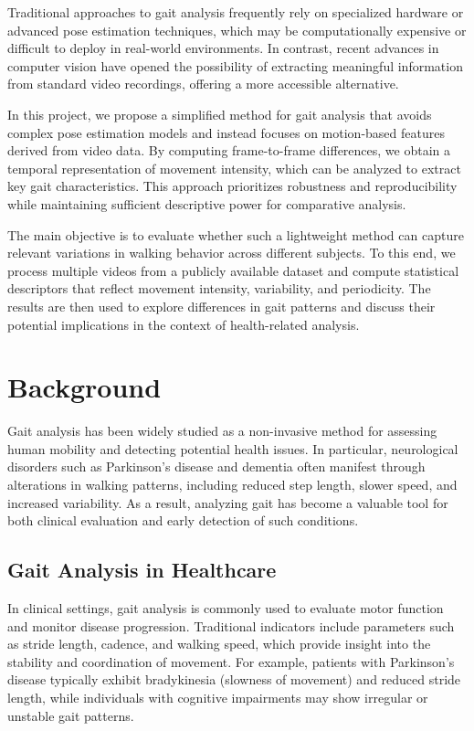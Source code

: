 \documentclass[12pt,a4paper]{article} %
\begin{document}
Traditional approaches to gait analysis frequently rely on specialized hardware or advanced pose estimation techniques, which may be computationally expensive or difficult to deploy in real-world environments. In contrast, recent advances in computer vision have opened the possibility of extracting meaningful information from standard video recordings, offering a more accessible alternative.

In this project, we propose a simplified method for gait analysis that avoids complex pose estimation models and instead focuses on motion-based features derived from video data. By computing frame-to-frame differences, we obtain a temporal representation of movement intensity, which can be analyzed to extract key gait characteristics. This approach prioritizes robustness and reproducibility while maintaining sufficient descriptive power for comparative analysis.

The main objective is to evaluate whether such a lightweight method can capture relevant variations in walking behavior across different subjects. To this end, we process multiple videos from a publicly available dataset and compute statistical descriptors that reflect movement intensity, variability, and periodicity. The results are then used to explore differences in gait patterns and discuss their potential implications in the context of health-related analysis.

\clearpage

\section{Background}
Gait analysis has been widely studied as a non-invasive method for assessing human mobility and detecting potential health issues. In particular, neurological disorders such as Parkinson’s disease and dementia often manifest through alterations in walking patterns, including reduced step length, slower speed, and increased variability. As a result, analyzing gait has become a valuable tool for both clinical evaluation and early detection of such conditions.

\subsection{Gait Analysis in Healthcare}
In clinical settings, gait analysis is commonly used to evaluate motor function and monitor disease progression. Traditional indicators include parameters such as stride length, cadence, and walking speed, which provide insight into the stability and coordination of movement. For example, patients with Parkinson’s disease typically exhibit bradykinesia (slowness of movement) and reduced stride length, while individuals with cognitive impairments may show irregular or unstable gait patterns.
\end{document}
